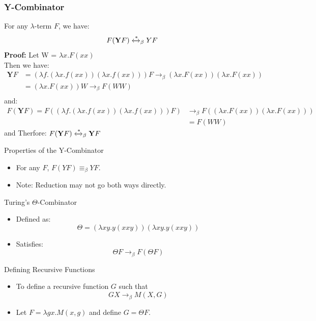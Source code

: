 \documentclass{beamer}
\begin{document}
\begin{frame}
  \frametitle{Y-Combinator}
  \begin{lemma}
    
    For any \(\lambda\)-term \(F\), we have:
    \vspace{-0.5em}
    \[
      F(\mathbf{Y} F) \xleftrightarrow{*}_\beta Y F
    \]
    \textbf{Proof:}
    Let W = \(\lambda x. F (x x)\)\\
    Then we have:
    \[
      \begin{aligned}
      \mathbf{Y} F &= (\lambda f. (\lambda x. f (x x)) (\lambda x. f (x x))) F
      \rightarrow_\beta (\lambda x. F (x x)) (\lambda x. F (x x)) \\
      &= (\lambda x. F (x x))W       \rightarrow_\beta F(W W) \\
    \end{aligned}
    \]
    and:
    \[
      \begin{aligned}
      F(\mathbf{Y} F) = F((\lambda f. (\lambda x. f (x x)) (\lambda x. f (x x))) F) &\rightarrow_\beta F((\lambda x. F (x x)) (\lambda x. F (x x))) \\
      &= F(WW)
      \end{aligned}
    \]
    and Therfore: \(F(\mathbf{Y}F) \xleftrightarrow{*}_\beta \mathbf{Y}F\)
    
  \end{lemma}
\end{frame}

\begin{frame}{Properties of the Y-Combinator}
  \begin{itemize}
    \item For any \(F\), \(F (Y F) \equiv_\beta Y F\).
    \item Note: Reduction may not go both ways directly.
  \end{itemize}
\end{frame}

\begin{frame}{Turing's $\Theta$-Combinator}
  \begin{itemize}
    \item Defined as:
      \[
      \Theta = (\lambda x y. y(x x y)) (\lambda x y. y(x x y))
      \]
    \item Satisfies:
      \[
      \Theta F \rightarrow_\beta F (\Theta F)
      \]
  \end{itemize}
\end{frame}

\begin{frame}{Defining Recursive Functions}
  \begin{itemize}
    \item To define a recursive function \(G\) such that
      \[
      G X \rightarrow_\beta M(X, G)
      \]
    \item Let \(F = \lambda g x. M(x, g)\) and define \(G = \Theta F\).
  \end{itemize}
\end{frame}
\end{document}
